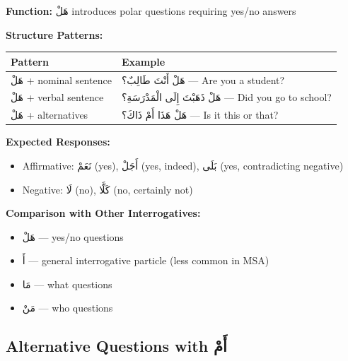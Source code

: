 \documentclass[letterpaper,12pt]{article}
\begin{document}
\begin{tcolorbox}[colback=boxcolor,colframe=headercolor,breakable]
\textbf{Function:} \textarabic{هَلْ} introduces polar questions requiring yes/no answers

\textbf{Structure Patterns:}

\begin{tabular}{|l|p{10cm}|}
\hline
\textbf{Pattern} & \textbf{Example} \\
\hline
\textarabic{هَلْ} + nominal sentence & \textarabic{هَلْ أَنْتَ طَالِبٌ؟} — Are you a student? \\
\hline
\textarabic{هَلْ} + verbal sentence & \textarabic{هَلْ ذَهَبْتَ إِلَى الْمَدْرَسَةِ؟} — Did you go to school? \\
\hline
\textarabic{هَلْ} + alternatives & \textarabic{هَلْ هَذَا أَمْ ذَاكَ؟} — Is it this or that? \\
\hline
\end{tabular}

\vspace{0.5em}
\textbf{Expected Responses:}
\begin{itemize}
\item Affirmative: \textarabic{نَعَمْ} (yes), \textarabic{أَجَلْ} (yes, indeed), \textarabic{بَلَى} (yes, contradicting negative)
\item Negative: \textarabic{لَا} (no), \textarabic{كَلَّا} (no, certainly not)
\end{itemize}

\vspace{0.5em}
\textbf{Comparison with Other Interrogatives:}
\begin{itemize}
\item \textarabic{هَلْ} — yes/no questions
\item \textarabic{أَ} — general interrogative particle (less common in MSA)
\item \textarabic{مَا} — what questions
\item \textarabic{مَنْ} — who questions
\end{itemize}
\end{tcolorbox}

\subsection{Alternative Questions with \textarabic{أَمْ}}
\end{document}
